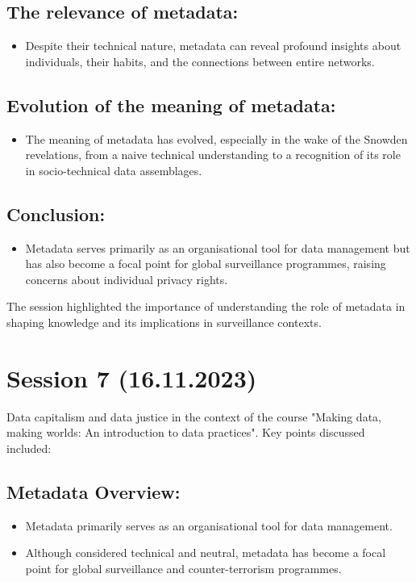 \documentclass{article}
\begin{document}
\subsection*{The relevance of metadata:}
\begin{itemize}
    \item Despite their technical nature, metadata can reveal profound insights about individuals, their habits, and the connections between entire networks.
\end{itemize}

\subsection*{Evolution of the meaning of metadata:}
\begin{itemize}
    \item The meaning of metadata has evolved, especially in the wake of the Snowden revelations, from a naive technical understanding to a recognition of its role in socio-technical data assemblages.
\end{itemize}

\subsection*{Conclusion:}
\begin{itemize}
    \item Metadata serves primarily as an organisational tool for data management but has also become a focal point for global surveillance programmes, raising concerns about individual privacy rights.
\end{itemize}

The session highlighted the importance of understanding the role of metadata in shaping knowledge and its implications in surveillance contexts.
\section*{Session 7 (16.11.2023)}
Data capitalism and data justice in the context of the course "Making data, making worlds: An introduction to data practices". Key points discussed included:

\subsection*{Metadata Overview:}
\begin{itemize}
    \item Metadata primarily serves as an organisational tool for data management.
    \item Although considered technical and neutral, metadata has become a focal point for global surveillance and counter-terrorism programmes.
\end{itemize}
\end{document}
